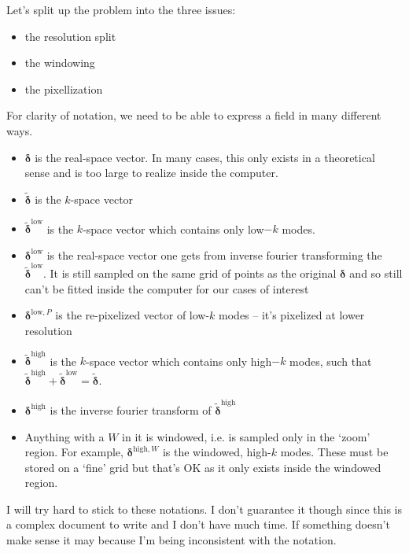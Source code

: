 \documentclass[11pt,a4paper,preprint]{aastex}
\newcommand{\low}{\mathrm{low}}
\newcommand{\high}{\mathrm{high}}
\newcommand{\bmath}[1]{\ensuremath{\bm{#1}}}
\renewcommand{\vec}[1]{\bmath{#1}}
\begin{document}
Let's split up the problem into the three issues:

\begin{itemize}
\item the resolution split
\item the windowing
\item the pixellization
\end{itemize}

For clarity of notation, we need to be able to express a field in many
different ways.

\begin{itemize}
    \item $\vec{\delta}$ is the real-space vector. In many cases, this only
    exists in a theoretical sense and is too large to realize inside the computer.
    \item $\tilde{\vec{\delta}}$ is the $k$-space vector
    \item $\tilde{\vec{\delta}}^{\low}$ is the $k$-space vector which contains
    only low$-k$ modes.
    \item ${\vec{\delta}}^{\low}$ is the real-space vector one gets from
    inverse fourier transforming the $\tilde{\vec{\delta}}^{\low}$. It is still
    sampled on the same grid of points as the original $\vec{\delta}$ and so still
    can't be fitted inside the computer for our cases of interest
    \item $\vec{\delta}^{\low,P}$ is the re-pixelized vector of low-$k$ modes -- it's
    pixelized at lower resolution
    \item  $\tilde{\vec{\delta}}^{\high}$ is the $k$-space vector which contains
    only high$-k$ modes, such that $\tilde{\vec{\delta}}^{\high}+\tilde{\vec{\delta}}^{\low}=\tilde{\vec{\delta}}$.
    \item $\vec{\delta}^{\high}$ is the inverse fourier transform of $\tilde{\vec{\delta}}^{\high}$
    \item Anything with a $W$ in it is windowed, i.e. is sampled only in the `zoom' region. For example,
    $\vec{\delta}^{\high,W}$ is the windowed, high-$k$ modes. These must be stored on a `fine' grid but
    that's OK as it only exists inside the windowed region.
\end{itemize}

I will try hard to stick to these notations. I don't guarantee it
though since this is a complex document to write and I don't have much
time. If something doesn't make sense it may because I'm being
inconsistent with the notation.
\end{document}
